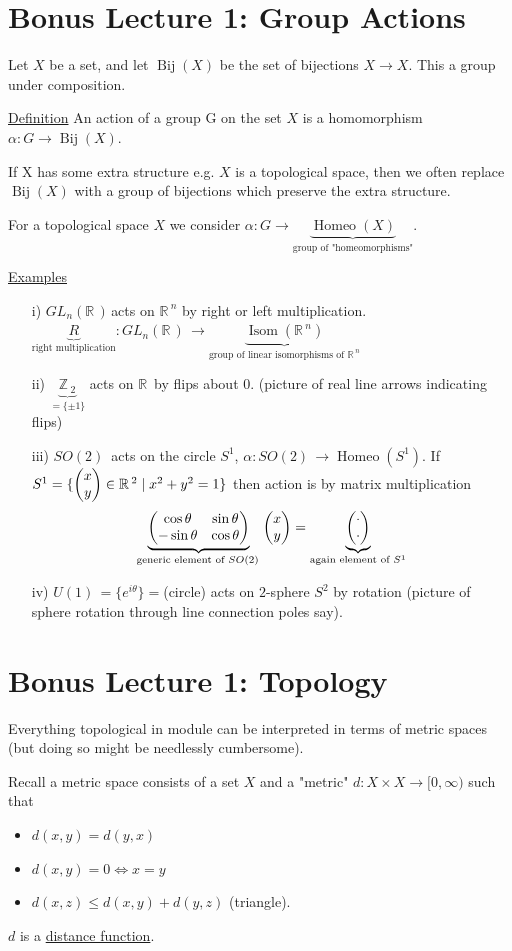 \documentclass[12pt,a4paper]{article}
\newcommand{\zZ}{\ensuremath{\mathbb{Z}\,}}
\newcommand{\rR}{\ensuremath{\mathbb{R}\,}}
\newcommand{\glnr}{\ensuremath{GL_n(\rR)\,}}
\newcommand{\guk}[1]{\ensuremath{U(#1)\,}}
\newcommand{\gsok}[1]{\ensuremath{SO(#1)\,}}
\newcommand{\ul}[1]{\underline{#1}}
\newcommand{\bij}[1]{\ensuremath{\operatorname{Bij}(#1)}}
\newcommand{\homeo}[1]{\ensuremath{\operatorname{Homeo}(#1)}}
\begin{document}
\section{Bonus Lecture 1: Group Actions}
Let $X$ be a set, and let $\bij{X}$ be the set of bijections $X\to X$. This a group under composition.

\ul{Definition} An action of a group G on the set $X$ is a homomorphism $\alpha:G\to \bij{X}$.

If X has some extra structure e.g. $X$ is a topological space, then we often replace \bij{X} with a group of bijections which preserve the extra structure.

For a topological space $X$ we consider $\alpha:G\to \underbrace{\homeo{X}}_{\text{group of "homeomorphisms"}}$.

\ul{Examples} 
\begin{itemize}
\item[i)]\glnr acts on $\rR^n$ by right or left multiplication. $\underbrace{R}_{\text{right multiplication}}:\glnr \to \underbrace{\operatorname{Isom}(\rR^n)}_{\text{group of linear isomorphisms of } \rR^n}$
\item[ii)] $\underbrace{\zZ_2}_{=\{\pm 1\}}$ acts on $\rR$ by flips about $0$. (picture of real line arrows indicating flips)
\item[iii)] \gsok{2} acts on the circle $S^1$, $\alpha:\gsok{2}\to \homeo{S^1}$. If $S^1=\{\pmqty{x \\ y} \in \rR^2\mid x^2+y^2=1\}$ then action is by matrix multiplication
\[\underbrace{\pmqty{\cos \theta & \sin \theta \\ -\sin \theta & \cos \theta}}_{\text{generic element of }\gsok{2}}\pmqty{x \\ y} = \underbrace{\pmqty{\cdot \\ \cdot}}_{\text{again element of }S^1}\]
\item[iv)] $\guk{1}=\{e^{i\theta}\}=$(circle) acts on $2$-sphere $S^2$ by rotation (picture of sphere rotation through line connection poles say).
\end{itemize}

\section{Bonus Lecture 1: Topology}
Everything topological in module can be interpreted in terms of metric spaces (but doing so might be needlessly cumbersome).

Recall a metric space consists of a set $X$ and a "metric" $d:X\times X\to [0,\infty)$ such that
\begin{itemize}
\item $d(x,y)=d(y,x)$
\item $d(x,y)=0 \iff x=y$
\item $d(x,z)\leq d(x,y)+d(y,z)$ (triangle).
\end{itemize}
$d$ is a \ul{distance function}.
\end{document}
